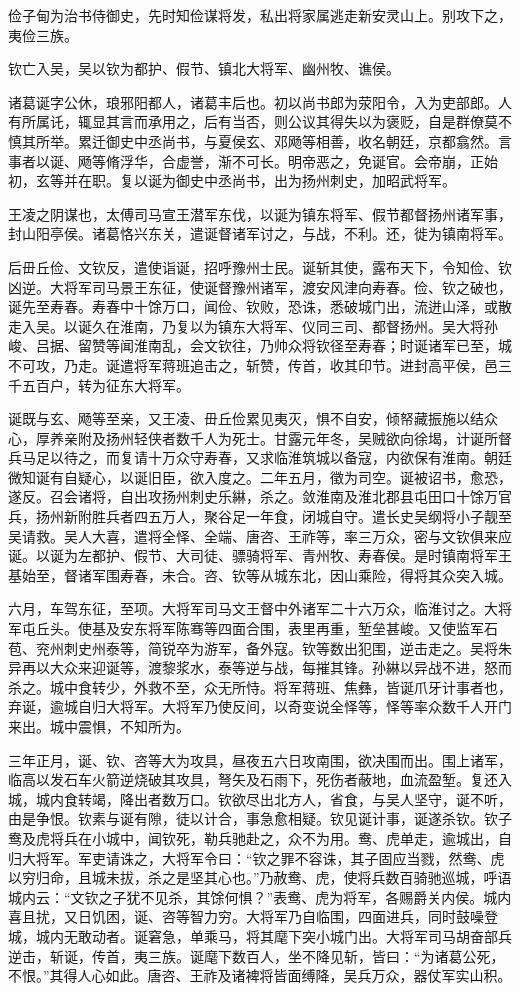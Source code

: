 \documentclass[12pt,UTF8]{ctexbook}
\begin{document}
俭子甸为治书侍御史，先时知俭谋将发，私出将家属逃走新安灵山上。别攻下之，夷俭三族。

钦亡入吴，吴以钦为都护、假节、镇北大将军、幽州牧、谯侯。

诸葛诞字公休，琅邪阳都人，诸葛丰后也。初以尚书郎为荥阳令，入为吏部郎。人有所属讬，辄显其言而承用之，后有当否，则公议其得失以为褒贬，自是群僚莫不慎其所举。累迁御史中丞尚书，与夏侯玄、邓飏等相善，收名朝廷，京都翕然。言事者以诞、飏等脩浮华，合虚誉，渐不可长。明帝恶之，免诞官。会帝崩，正始初，玄等并在职。复以诞为御史中丞尚书，出为扬州刺史，加昭武将军。

王凌之阴谋也，太傅司马宣王潜军东伐，以诞为镇东将军、假节都督扬州诸军事，封山阳亭侯。诸葛恪兴东关，遣诞督诸军讨之，与战，不利。还，徙为镇南将军。

后毌丘俭、文钦反，遣使诣诞，招呼豫州士民。诞斩其使，露布天下，令知俭、钦凶逆。大将军司马景王东征，使诞督豫州诸军，渡安风津向寿春。俭、钦之破也，诞先至寿春。寿春中十馀万口，闻俭、钦败，恐诛，悉破城门出，流迸山泽，或散走入吴。以诞久在淮南，乃复以为镇东大将军、仪同三司、都督扬州。吴大将孙峻、吕据、留赞等闻淮南乱，会文钦往，乃帅众将钦径至寿春；时诞诸军已至，城不可攻，乃走。诞遣将军蒋班追击之，斩赞，传首，收其印节。进封高平侯，邑三千五百户，转为征东大将军。

诞既与玄、飏等至亲，又王凌、毌丘俭累见夷灭，惧不自安，倾帑藏振施以结众心，厚养亲附及扬州轻侠者数千人为死士。甘露元年冬，吴贼欲向徐堨，计诞所督兵马足以待之，而复请十万众守寿春，又求临淮筑城以备寇，内欲保有淮南。朝廷微知诞有自疑心，以诞旧臣，欲入度之。二年五月，徵为司空。诞被诏书，愈恐，遂反。召会诸将，自出攻扬州刺史乐綝，杀之。敛淮南及淮北郡县屯田口十馀万官兵，扬州新附胜兵者四五万人，聚谷足一年食，闭城自守。遣长史吴纲将小子靓至吴请救。吴人大喜，遣将全怿、全端、唐咨、王祚等，率三万众，密与文钦俱来应诞。以诞为左都护、假节、大司徒、骠骑将军、青州牧、寿春侯。是时镇南将军王基始至，督诸军围寿春，未合。咨、钦等从城东北，因山乘险，得将其众突入城。

六月，车驾东征，至项。大将军司马文王督中外诸军二十六万众，临淮讨之。大将军屯丘头。使基及安东将军陈骞等四面合围，表里再重，堑垒甚峻。又使监军石苞、兖州刺史州泰等，简锐卒为游军，备外寇。钦等数出犯围，逆击走之。吴将朱异再以大众来迎诞等，渡黎浆水，泰等逆与战，每摧其锋。孙綝以异战不进，怒而杀之。城中食转少，外救不至，众无所恃。将军蒋班、焦彝，皆诞爪牙计事者也，弃诞，逾城自归大将军。大将军乃使反间，以奇变说全怿等，怿等率众数千人开门来出。城中震惧，不知所为。

三年正月，诞、钦、咨等大为攻具，昼夜五六日攻南围，欲决围而出。围上诸军，临高以发石车火箭逆烧破其攻具，弩矢及石雨下，死伤者蔽地，血流盈堑。复还入城，城内食转竭，降出者数万口。钦欲尽出北方人，省食，与吴人坚守，诞不听，由是争恨。钦素与诞有隙，徒以计合，事急愈相疑。钦见诞计事，诞遂杀钦。钦子鸯及虎将兵在小城中，闻钦死，勒兵驰赴之，众不为用。鸯、虎单走，逾城出，自归大将军。军吏请诛之，大将军令曰：“钦之罪不容诛，其子固应当戮，然鸯、虎以穷归命，且城未拔，杀之是坚其心也。”乃赦鸯、虎，使将兵数百骑驰巡城，呼语城内云：“文钦之子犹不见杀，其馀何惧？”表鸯、虎为将军，各赐爵关内侯。城内喜且扰，又日饥困，诞、咨等智力穷。大将军乃自临围，四面进兵，同时鼓噪登城，城内无敢动者。诞窘急，单乘马，将其麾下突小城门出。大将军司马胡奋部兵逆击，斩诞，传首，夷三族。诞麾下数百人，坐不降见斩，皆曰：“为诸葛公死，不恨。”其得人心如此。唐咨、王祚及诸裨将皆面缚降，吴兵万众，器仗军实山积。
\end{document}
